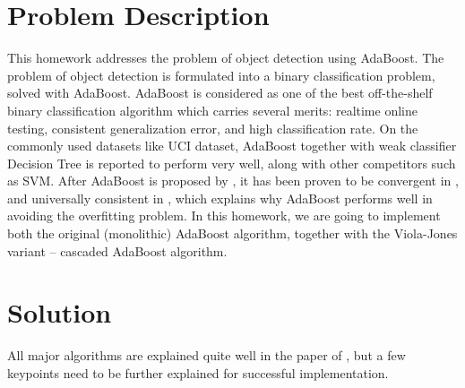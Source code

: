 \documentclass[12pt]{article}
\begin{document}
\makehwtitle%

\section{Problem Description}
This homework addresses the problem of object detection using AdaBoost. The problem of object detection is formulated into a binary classification problem, solved with AdaBoost. AdaBoost is considered as one of the best off-the-shelf binary classification algorithm which carries several merits: realtime online testing, consistent generalization error, and high classification rate. On the commonly used datasets like UCI dataset, AdaBoost together with weak classifier Decision Tree is reported to perform very well, along with other competitors such as SVM. After AdaBoost is proposed by \cite{Freund1997}, it has been proven to be convergent in \cite{Friedman1998}, and universally consistent in \cite{Bartlett2007}, which explains why AdaBoost performs well in avoiding the overfitting problem. In this homework, we are going to implement both the original (monolithic) AdaBoost algorithm, together with the Viola-Jones variant -- cascaded AdaBoost algorithm.

\section{Solution}
All major algorithms are explained quite well in the paper of \cite{Viola2004}, but a few keypoints need to be further explained for successful implementation.
\end{document}

